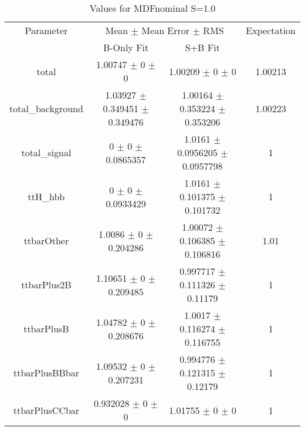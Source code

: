 \begin{table}
\centering
\caption{Values for MDFnominal S=1.0}
\begin{tabular}{cccc}
\toprule
Parameter & \multicolumn{2}{c}{Mean $\pm$ Mean Error $\pm$ RMS} & Expectation\\
 & B-Only Fit & S+B Fit & \\
\midrule
total & \num{1.00747} $\pm$ \num{0} $\pm$ \num{0} & \num{1.00209} $\pm$ \num{0} $\pm$ \num{0} & \num{1.00213}\\
total\_background & \num{1.03927} $\pm$ \num{0.349451} $\pm$ \num{0.349476} & \num{1.00164} $\pm$ \num{0.353224} $\pm$ \num{0.353206} & \num{1.00223}\\
total\_signal & \num{0} $\pm$ \num{0} $\pm$ \num{0.0865357} & \num{1.0161} $\pm$ \num{0.0956205} $\pm$ \num{0.0957798} & \num{1}\\
ttH\_hbb & \num{0} $\pm$ \num{0} $\pm$ \num{0.0933429} & \num{1.0161} $\pm$ \num{0.101375} $\pm$ \num{0.101732} & \num{1}\\
ttbarOther & \num{1.0086} $\pm$ \num{0} $\pm$ \num{0.204286} & \num{1.00072} $\pm$ \num{0.106385} $\pm$ \num{0.106816} & \num{1.01}\\
ttbarPlus2B & \num{1.10651} $\pm$ \num{0} $\pm$ \num{0.209485} & \num{0.997717} $\pm$ \num{0.111326} $\pm$ \num{0.11179} & \num{1}\\
ttbarPlusB & \num{1.04782} $\pm$ \num{0} $\pm$ \num{0.208676} & \num{1.0017} $\pm$ \num{0.116274} $\pm$ \num{0.116755} & \num{1}\\
ttbarPlusBBbar & \num{1.09532} $\pm$ \num{0} $\pm$ \num{0.207231} & \num{0.994776} $\pm$ \num{0.121315} $\pm$ \num{0.12179} & \num{1}\\
ttbarPlusCCbar & \num{0.932028} $\pm$ \num{0} $\pm$ \num{0} & \num{1.01755} $\pm$ \num{0} $\pm$ \num{0} & \num{1}\\
\bottomrule
\end{tabular}
\end{table}